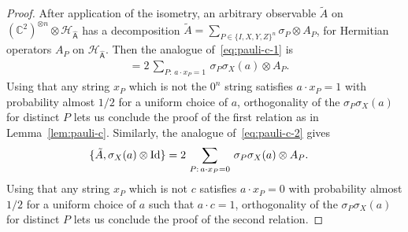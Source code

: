\documentclass[11pt]{article}
\theoremstyle{remark}
\theoremstyle{definition}
\newcommand{\Id}{\ensuremath{\mathop{\rm Id}\nolimits}}
\newcommand{\reg}[1]{{\textsf{#1}}}
\newcommand{\C}{\ensuremath{\mathbb{C}}}
\newcommand{\mH}{\mathcal{H}}
\begin{document}
\begin{proof}
After application of the isometry, an arbitrary observable $\tilde{A}$ on  $(\C^2)^{\otimes n} \otimes \mH_{\hat{\reg{A}}}$ has a decomposition $\tilde{A} = \sum_{P\in\{I,X,Y,Z\}^n} \sigma_P \otimes A_P$, for Hermitian operators $A_P$ on $\mH_{\hat{\reg{A}}}$. 
 Then the analogue of~\eqref{eq:pauli-c-1} is
\begin{align*}
[\tilde{A},\sigma_X(a)\otimes \Id] &= 2 \,\sum_{P:\,a\cdot x_P=1} \,\sigma_P\sigma_X(a) \otimes A_P.
\end{align*} 
Using that any string $x_P$ which is not the $0^n$ string satisfies $a\cdot x_P = 1$ with probability almost $1/2$ for a uniform choice of $a$, orthogonality of the $\sigma_P\sigma_X(a) $ for distinct $P$ lets us conclude the proof of the first relation as in Lemma~\ref{lem:pauli-c}. Similarly, the analogue of~\eqref{eq:pauli-c-2} gives
\begin{align*}
\{\tilde{A},\sigma_X(a)\otimes \Id\} &= 2 \,\sum_{P:\,a\cdot x_P=0} \,\sigma_P\sigma_X(a) \otimes A_P.
\end{align*} 
Using that any string $x_P$ which is not $c$ satisfies $a\cdot x_P = 0$ with probability almost $1/2$ for a uniform choice of $a$ such that $a\cdot c=1$, orthogonality of the $\sigma_P\sigma_X(a) $ for distinct $P$ lets us conclude the proof of the second relation.
\end{proof}
\end{document}
